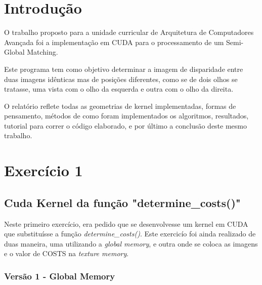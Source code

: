 \documentclass[pdftex,12pt,a4paper]{report}
\begin{document}
\renewcommand{\headrulewidth}{0pt}

\fancyhead{}
\fancyfoot{}
\rfoot{\thepage}

\renewcommand*\contentsname{Conteúdos}
\renewcommand*\figurename{Figura}
\renewcommand*\tablename{Tabela}

\tableofcontents
\renewcommand{\headrulewidth}{0.15pt}
\renewcommand{\thechapter}{}

\clearpage

\section{Introdução}

O trabalho proposto para a unidade curricular de Arquitetura de Computadores Avançada foi a implementação em CUDA para o processamento de um Semi-Global Matching. 

Este programa tem como objetivo determinar a imagem de disparidade entre duas imagens idênticas mas de posições diferentes, como se de dois olhos se tratasse, uma vista com o olho da esquerda e outra com o olho da direita.

O relatório reflete todas as geometrias de kernel implementadas, formas de pensamento, métodos de como foram implementados os algoritmos, resultados, tutorial para correr o código elaborado, e por último a conclusão deste mesmo trabalho.

\newpage
\section{Exercício 1}

\subsection{Cuda Kernel da função "determine\_costs()"}
Neste primeiro exercício, era pedido que se desenvolvesse um kernel em CUDA que substituísse a função \textit{determine\_costs()}.
Este exercicío foi ainda realizado de duas maneira, uma utilizando a \textit{global memory}, e outra onde se coloca as imagens e o valor de COSTS na \textit{texture memory}. 

\subsubsection{Versão 1 - Global Memory}
\end{document}
